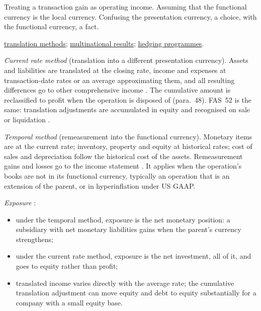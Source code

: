 \begin{qfdefinition}
 Treating a transaction gain as operating income. Assuming that the functional currency is the local currency. Confusing the presentation currency, a choice, with the functional currency, a fact.

 \hyperref[meth:currency-translation-methods]{translation methods}; \hyperref[meth:multinational-currency-tax-analysis]{multinational results}; \hyperref[meth:currency-hedging-programme]{hedging programmes}.

\end{qfdefinition}

\begin{qfmethod}\label{meth:currency-translation-methods}
 \emph{Current rate method} (translation into a different presentation currency). Assets and liabilities are translated at the closing rate, income and expenses at transaction-date rates or an average approximating them, and all resulting differences go to other comprehensive income \citep[paras.~39--40]{eu-2023-1803-ias21}. The cumulative amount is reclassified to profit when the operation is disposed of (para.~48). FAS~52 is the same: translation adjustments are accumulated in equity and recognised on sale or liquidation \citep[paras.~12--14]{us-foreign-currency-1981}.

\emph{Temporal method} (remeasurement into the functional currency). Monetary items are at the current rate; inventory, property and equity at historical rates; cost of sales and depreciation follow the historical cost of the assets. Remeasurement gains and losses go to the income statement \citep[pp.~302--304]{financial-statement-analysis-2009}. It applies when the operation's books are not in its functional currency, typically an operation that is an extension of the parent, or in hyperinflation under US GAAP.

\emph{Exposure} \citep[pp.~307--311]{financial-statement-analysis-2009}:
\begin{itemize}
\item under the temporal method, exposure is the net monetary position: a subsidiary with net monetary liabilities gains when the parent's currency strengthens;
\item under the current rate method, exposure is the net investment, all of it, and goes to equity rather than profit;
\item translated income varies directly with the average rate; the cumulative translation adjustment can move equity and debt to equity substantially for a company with a small equity base.
\end{itemize}


\end{qfmethod}
